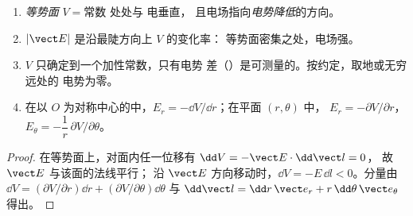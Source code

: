 \begin{proposition}[电势的读法]\label{prop:b1:potential-capacitors:reading}
\begin{enumerate}
  \item \emph{等势面} $V = \text{常数}$ 处处与
        电垂直，
        且电场指向\emph{电势降低}的方向。
  \item $|\vect E|$ 是沿最陡方向上 $V$ 的变化率：
        等势面密集之处，电场强。
  \item $V$ 只确定到一个加性常数，只有电势
        差（）是可测量的。按约定，取地或无穷远处的
        电势为零。
  \item 在以 $O$ 为对称中心的中，$E_r = -\dd V/
        \dd r$；在平面 $(r, \theta)$ 中，
        $E_r = -\partial V/\partial r$，$E_\theta = -\dfrac1r\,\partial V/\partial\theta$。
\end{enumerate}
\end{proposition}

\begin{proof}
在等势面上，对面内任一位移有 $\dd V = -\vect E\cdot\dd\vect l = 0$，
故 $\vect E$ 与该面的法线平行；
沿 $\vect E$ 方向移动时，$\dd V = -E\,\dd l < 0$。分量由
$\dd V = (\partial V/\partial r)\dd r + (\partial V/\partial\theta)\dd\theta$ 与
$\dd\vect l = \dd r\,\vect e_r + r\,\dd\theta\,\vect e_\theta$ 得出。
\end{proof}

